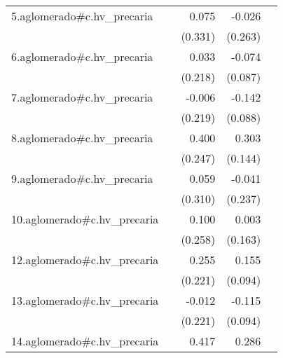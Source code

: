 {\begin{longtable}{l*{4}{D{.}{.}{-1}}}
\addlinespace
5.aglomerado#c.hv\_precaria&                     &       0.075         &      -0.026         &                     \\
            &                     &     (0.331)         &     (0.263)         &                     \\
\addlinespace
6.aglomerado#c.hv\_precaria&                     &       0.033         &      -0.074         &                     \\
            &                     &     (0.218)         &     (0.087)         &                     \\
\addlinespace
7.aglomerado#c.hv\_precaria&                     &      -0.006         &      -0.142         &                     \\
            &                     &     (0.219)         &     (0.088)         &                     \\
\addlinespace
8.aglomerado#c.hv\_precaria&                     &       0.400         &       0.303\sym{*}  &                     \\
            &                     &     (0.247)         &     (0.144)         &                     \\
\addlinespace
9.aglomerado#c.hv\_precaria&                     &       0.059         &      -0.041         &                     \\
            &                     &     (0.310)         &     (0.237)         &                     \\
\addlinespace
10.aglomerado#c.hv\_precaria&                     &       0.100         &       0.003         &                     \\
            &                     &     (0.258)         &     (0.163)         &                     \\
\addlinespace
12.aglomerado#c.hv\_precaria&                     &       0.255         &       0.155         &                     \\
            &                     &     (0.221)         &     (0.094)         &                     \\
\addlinespace
13.aglomerado#c.hv\_precaria&                     &      -0.012         &      -0.115         &                     \\
            &                     &     (0.221)         &     (0.094)         &                     \\
\addlinespace
14.aglomerado#c.hv\_precaria&                     &       0.417         &       0.286         &                     \\

\end{longtable}}
